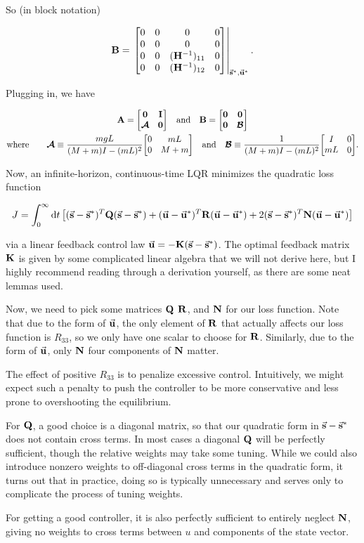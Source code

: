 \documentclass{article}
\begin{document}
    So (in block notation)

    \[
        \vb{B} = \eval{\mqty[0 & 0 & 0 & 0 \\ 0 & 0 & 0 & 0 \\ 0 & 0 & (\vb{H}^{-1})_{11} & 0 \\ 0 & 0 & (\vb{H}^{-1})_{12} & 0]}_{\va{s}^*, \va{u}^*}.
    \]

    Plugging in, we have

    \begin{gather*}
        \vb{A} = \mqty[\vb{0} & \vb{I} \\ \vb*{\mathcal{A}} & \vb{0}] \qq{and} \vb{B} = \mqty[\vb{0} & \vb{0} \\ \vb{0} & \vb*{\mathcal{B}}]\\
        \text{where} \qquad \vb*{\mathcal{A}} \equiv \frac{mgL}{(M + m)I - (mL)^2}\mqty[0 & mL \\ 0 & M + m] \qq{and} \vb*{\mathcal{B}} \equiv \frac{1}{(M + m)I - (mL)^2}\mqty[I & 0 \\ mL & 0].
    \end{gather*}

    Now, an infinite-horizon, continuous-time LQR minimizes the quadratic loss function

    \[
        J = \int_0^\infty \dd{t} \qty[(\va{s} - \va{s}^*)^T\vb{Q}(\va{s} - \va{s}^*) + (\va{u} - \va{u}^*)^T\vb{R}(\va{u} - \va{u}^*) + 2(\va{s} - \va{s}^*)^T\vb{N}(\va{u} - \va{u}^*)]
    \]

    via a linear feedback control law $\va{u} = -\vb{K}(\va{s} - \va{s}^*)$.
    The optimal feedback matrix $\vb{K}$ is given by some complicated linear algebra that we will not derive here, but I highly recommend reading through a derivation yourself, as there are some neat lemmas used.

    Now, we need to pick some matrices $\vb{Q}$ $\vb{R}$, and $\vb{N}$ for our loss function.
    Note that due to the form of $\va{u}$, the only element of $\vb{R}$ that actually affects our loss function is $R_{33}$, so we only have one scalar to choose for $\vb{R}$.
    Similarly, due to the form of $\va{u}$, only $\vb{N}$ four components of $\vb{N}$ matter.

    The effect of positive $R_{33}$ is to penalize excessive control.
    Intuitively, we might expect such a penalty to push the controller to be more conservative and less prone to overshooting the equilibrium.

    For $\vb{Q}$, a good choice is a diagonal matrix, so that our quadratic form in $\va{s} - \va{s}^*$ does not contain cross terms.
    In most cases a diagonal $\vb{Q}$ will be perfectly sufficient, though the relative weights may take some tuning.
    While we could also introduce nonzero weights to off-diagonal cross terms in the quadratic form, it turns out that in practice, doing so is typically unnecessary and serves only to complicate the process of tuning weights.

    For getting a good controller, it is also perfectly sufficient to entirely neglect $\vb{N}$, giving no weights to cross terms between $u$ and components of the state vector.
\end{document}
